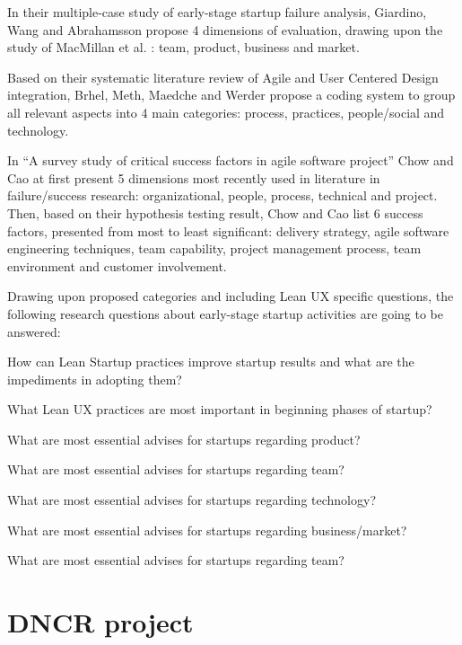 \documentclass{article}
\begin{document}
In their multiple-case study of early-stage startup failure analysis, Giardino, Wang and Abrahamsson \cite{giardino2014early} propose 4 dimensions of evaluation, drawing upon the study of MacMillan et al. \cite{macmillan1987criteria}: team, product, business and market.

Based on their systematic literature review of Agile and User Centered Design integration, Brhel, Meth, Maedche and Werder \cite{brhel2015exploring} propose a coding system to group all relevant aspects into 4 main categories: process, practices, people/social and technology.

In ``A survey study of critical success factors in agile software project'' Chow and Cao \cite{cao2008agile} at first present 5 dimensions most recently used in literature in failure/success research: organizational, people, process, technical and project. Then, based on their hypothesis testing result, Chow and Cao list 6 success factors, presented from most to least significant: delivery strategy, agile software engineering techniques, team capability, project management process, team environment and customer involvement.

Drawing upon proposed categories and including Lean UX specific questions, the following research questions about early-stage startup activities are going to be answered:

\begin{RQ}
    \item How can Lean Startup practices improve startup results and what are the impediments in adopting them?
    \item What Lean UX practices are most important in beginning phases of startup?
    \item What are most essential advises for startups regarding product?
    \item What are most essential advises for startups regarding team?
    \item What are most essential advises for startups regarding technology?
    \item What are most essential advises for startups regarding business/market?
    \item What are most essential advises for startups regarding team?
\end{RQ}

\section{DNCR project}
\label{sec:dncr-project}
\end{document}
